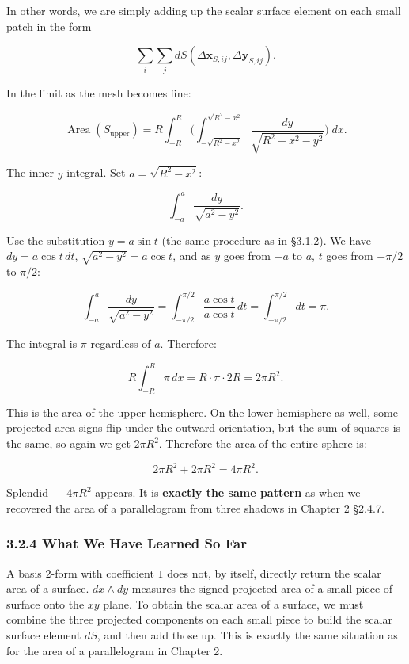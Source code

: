 \documentclass[a4paper,12pt,openany]{book}
\begin{document}
In other words, we are simply adding up the scalar surface element on
each small patch in the form

\[\sum_i\sum_j dS(\Delta\mathbf{x}_{S,ij},\Delta\mathbf{y}_{S,ij}).\]

In the limit as the mesh becomes fine:

\[
\operatorname{Area}(S_{\text{upper}})
= R\int_{-R}^{R}\biggl(\int_{-\sqrt{R^2-x^2}}^{\sqrt{R^2-x^2}}
\frac{dy}{\sqrt{R^2 - x^2 - y^2}}\biggr)\;dx.
\]

The inner \(y\) integral. Set \(a = \sqrt{R^2 - x^2}\):

\[\int_{-a}^{a} \frac{dy}{\sqrt{a^2 - y^2}}.\]

Use the substitution \(y = a\sin t\) (the same procedure as in §3.1.2).
We have \(dy = a\cos t\,dt\), \(\sqrt{a^2 - y^2} = a\cos t\), and as
\(y\) goes from \(-a\) to \(a\), \(t\) goes from \(-\pi/2\) to
\(\pi/2\):

\[\int_{-a}^{a} \frac{dy}{\sqrt{a^2 - y^2}} = \int_{-\pi/2}^{\pi/2} \frac{a\cos t}{a\cos t}\,dt = \int_{-\pi/2}^{\pi/2} dt = \pi.\]

The integral is \(\pi\) regardless of \(a\). Therefore:

\[R\int_{-R}^{R} \pi\,dx = R \cdot \pi \cdot 2R = 2\pi R^2.\]

This is the area of the upper hemisphere. On the lower hemisphere as
well, some projected-area signs flip under the outward orientation, but
the sum of squares is the same, so again we get \(2\pi R^2\). Therefore
the area of the entire sphere is:

\[2\pi R^2 + 2\pi R^2 = 4\pi R^2.\]

Splendid — \(4\pi R^2\) appears. It is
\textbf{exactly the same pattern} as when we recovered the area of a
parallelogram from three shadows in Chapter 2 §2.4.7.

\hypertarget{what-we-have-learned-so-far}{%
\subsubsection{3.2.4 What We Have Learned So
Far}\label{what-we-have-learned-so-far}}

A basis \(2\)-form with coefficient \(1\) does not, by itself, directly
return the scalar area of a surface. \(dx \wedge dy\) measures the
signed projected area of a small piece of surface onto the \(xy\) plane.
To obtain the scalar area of a surface, we must combine the three
projected components on each small piece to build the scalar surface
element \(dS\), and then add those up. This is exactly the same
situation as for the area of a parallelogram in Chapter 2.
\end{document}

